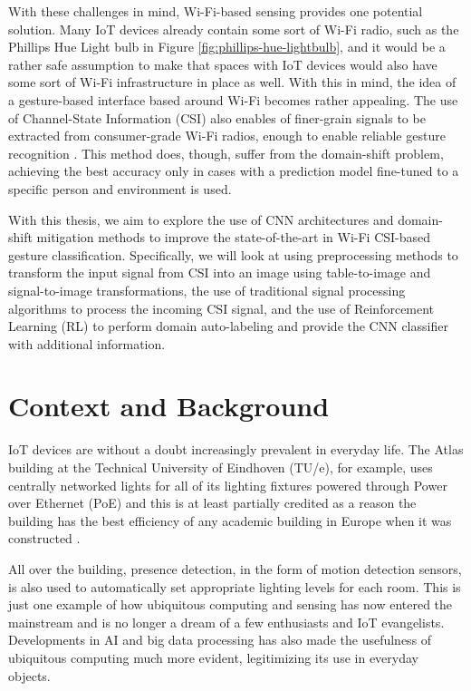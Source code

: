 With these challenges in mind, Wi-Fi-based sensing provides one potential solution.
Many IoT devices already contain some sort of Wi-Fi radio, such as the Phillips Hue Light bulb in Figure \ref{fig:phillips-hue-lightbulb}, and it would be a rather safe assumption to make that spaces with IoT devices would also have some sort of Wi-Fi infrastructure in place as well.
With this in mind, the idea of a gesture-based interface based around Wi-Fi becomes rather appealing.
The use of Channel-State Information (CSI) also enables of finer-grain signals to be extracted from consumer-grade Wi-Fi radios, enough to enable reliable gesture recognition \cite{adib2013see}.
This method does, though, suffer from the domain-shift problem, achieving the best accuracy only in cases with a prediction model fine-tuned to a specific person and environment is used.

With this thesis, we aim to explore the use of CNN architectures and domain-shift mitigation methods to improve the state-of-the-art in Wi-Fi CSI-based gesture classification.
Specifically, we will look at using preprocessing methods to transform the input signal from CSI into an image using table-to-image and signal-to-image transformations, the use of traditional signal processing algorithms to process the incoming CSI signal, and the use of Reinforcement Learning (RL) to perform domain auto-labeling and provide the CNN classifier with additional information.

\section{Context and Background}\label{sec:intro-context}

IoT devices are without a doubt increasingly prevalent in everyday life.
The Atlas building at the Technical University of Eindhoven (TU/e), for example, uses centrally networked lights for all of its lighting fixtures powered through Power over Ethernet (PoE) and this is at least partially credited as a reason the building has the best efficiency of any academic building in Europe when it was constructed \cite{tue2019atlas}.

All over the building, presence detection, in the form of motion detection sensors, is also used to automatically set appropriate lighting levels for each room.
This is just one example of how ubiquitous computing and sensing has now entered the mainstream and is no longer a dream of a few enthusiasts and IoT evangelists.
Developments in AI and big data processing has also made the usefulness of ubiquitous computing much more evident, legitimizing its use in everyday objects.

